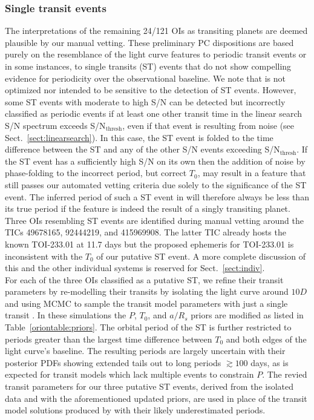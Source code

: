 \subsubsection{Single transit events} \label{sect:ste}
The interpretations of the remaining 24/121 OIs as transiting planets
are deemed plausible by our manual vetting. These preliminary PC dispositions are based purely on the
resemblance of the light curve features to periodic transit events or in some instances, to single
transits (ST) events that do not show compelling evidence for periodicity over the observational baseline.
We note that \pipeline{} is not optimized nor intended to be sensitive to the detection of ST
events. However, some ST events with moderate to high S/N can be detected but incorrectly classified as
periodic events if at least one other transit time in the linear search S/N spectrum exceeds
S/N$_{\text{thresh}}$, even if that event is resulting from noise (see Sect.~\ref{sect:linearsearch}).
In this case, the ST event is folded to the time difference between the ST and any of the other S/N
events exceeding S/N$_{\text{thresh}}$. If the ST event has a sufficiently high S/N on its own
then the addition of noise by phase-folding to the incorrect
period, but correct $T_0$, may result in a feature that still passes our automated vetting criteria due solely
to the significance of the ST event. The inferred period of such a ST event in \pipeline{} will therefore
always be less than its true period if the feature is indeed the result of a singly transiting planet. \\

Three OIs resembling ST events are identified during manual vetting around the TICs 49678165, 92444219,
and 415969908. The latter TIC already hosts the known TOI-233.01 at 11.7 days but the proposed ephemeris for
TOI-233.01 is inconsistent with the $T_0$ of our putative ST event. A more complete discussion of
this and the other individual systems is reserved for Sect.~\ref{sect:indiv}. \\

For each of the three OIs classified as a putative ST, we refine
their transit parameters by re-modelling their transits by isolating the light curve around $10D$ and
using MCMC to sample the transit model parameters with just a single transit \citep{seager03}. In these
simulations the $P$, $T_0$, and $a/R_s$ priors are modified as listed in Table~\ref{oriontable:priors}.
The orbital period of the ST is further restricted to periods greater than the largest time difference
between $T_0$ and both edges of the light curve's baseline. 
The resulting periods are largely uncertain with their posterior PDFs showing extended tails out to long
periods $\gtrsim 100$ days, as is expected for transit models which lack multiple events to constrain $P$.
The revied transit parameters for our three putative ST events, derived from the isolated data and with
the aforementioned updated priors, are used in place of the transit model solutions
produced by \pipeline{} with their likely underestimated periods.


